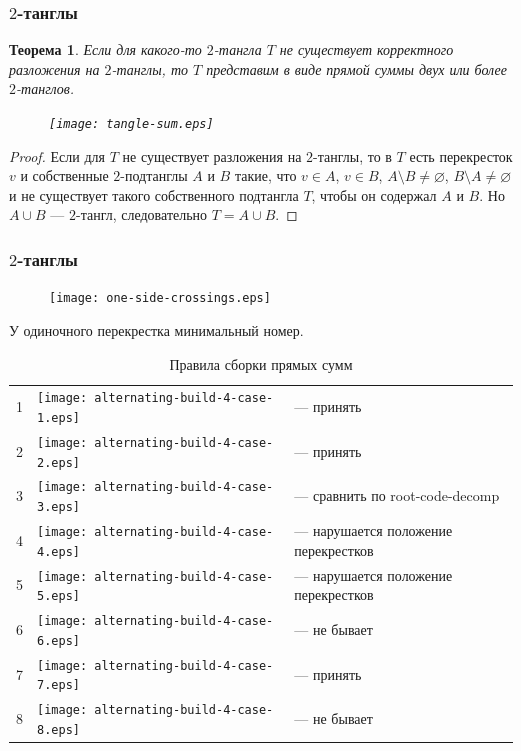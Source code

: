 \documentclass[dvips, intlimits, 9pt, unicode, notheorems]{beamer}
\theoremstyle{plain}
\newtheorem{theorem}{Теорема}
\theoremstyle{definition}
\begin{document}
	\begin{frame}
		\frametitle{$2$-танглы}

		\begin{theorem}
			Если для какого-то $2$-тангла $T$ не существует корректного разложения на $2$-танглы, то $T$ представим в виде прямой
			суммы двух или более $2$-танглов.
			\begin{figure}[H]
				\centering
				\texttt{[image: tangle-sum.eps]}
			\end{figure}
		\end{theorem}
		\begin{proof}
			Если для $T$ не существует разложения на $2$-танглы, то в $T$ есть перекресток $v$ и собственные $2$-подтанглы $A$ и $B$
			такие, что $v \in A$, $v \in B$, $A\setminus B\neq\varnothing$, $B\setminus A\neq\varnothing$ и не существует такого
			собственного подтангла $T$, чтобы он содержал $A$ и $B$. Но $A \cup B$ --- $2$-тангл, следовательно $T = A \cup B$.
		\end{proof}
	\end{frame}

	\begin{frame}
		\frametitle{$2$-танглы}

		\begin{figure}[ht]
			\centering
			\texttt{[image: one-side-crossings.eps]}
		\end{figure}

		
		\begin{center}
			У одиночного перекрестка минимальный номер.
		\end{center}

		\begin{table}[ht]
			\caption{Правила сборки прямых сумм\label{table:sums-rules}}
			\centering
			\begin{tabular}{cm{22mm}l}
				\hline
				1 & \texttt{[image: alternating-build-4-case-1.eps]} & --- принять \\
				2 & \texttt{[image: alternating-build-4-case-2.eps]} & --- принять \\
				3 & \texttt{[image: alternating-build-4-case-3.eps]} & --- сравнить по root-code-decomp \\
				4 & \texttt{[image: alternating-build-4-case-4.eps]} & --- нарушается положение перекрестков \\
				5 & \texttt{[image: alternating-build-4-case-5.eps]} & --- нарушается положение перекрестков \\
				6 & \texttt{[image: alternating-build-4-case-6.eps]} & --- не бывает \\
				7 & \texttt{[image: alternating-build-4-case-7.eps]} & --- принять \\
				8 & \texttt{[image: alternating-build-4-case-8.eps]} & --- не бывает \\
				\hline
			\end{tabular}
		\end{table}

	\end{frame}
\end{document}
